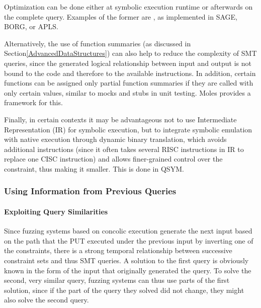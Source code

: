 \documentclass{article}
\begin{document}
\begin{multicols}{2}
    Optimization can be done either at symbolic execution runtime or afterwards on the complete query. Examples of the former are \cite{Science}, as implemented in SAGE\cite{SAGE}, BORG\cite{BORG}, or APLS\cite{APLS}.

    Alternatively, the use of function summaries (as discussed in Section\ref{AdvancedDataStructures}) can also help to reduce the complexity of SMT queries, since the generated logical relationship between input and output is not bound to the code and therefore to the available instructions. In addition, certain functions can be assigned only partial function summaries if they are called with only certain values, similar to mocks and stubs in unit testing. Moles\cite{Moles} provides a framework for this.

    Finally, in certain contexts it may be advantageous not to use Intermediate Representation (IR) for symbolic execution, but to integrate symbolic emulation with native execution through dynamic binary translation, which avoids additional instructions (since it often takes several RISC instructions in IR to replace one CISC instruction) and allows finer-grained control over the constraint, thus making it smaller. This is done in QSYM\cite{QSYM}.

    \subsubsection{Using Information from Previous Queries}
    \paragraph{Exploiting Query Similarities} Since fuzzing systems based on concolic execution generate the next input based on the path that the PUT executed under the previous input by inverting one of the constraints, there is a strong temporal relationship between successive constraint sets and thus SMT queries. A solution to the first query is obviously known in the form of the input that originally generated the query. To solve the second, very similar query, fuzzing systems can thus use parts of the first solution, since if the part of the query they solved did not change, they might also solve the second query.


\end{multicols}
\end{document}
